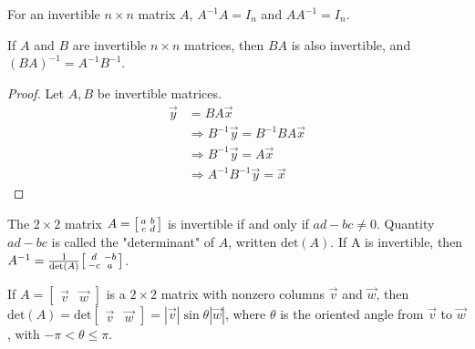 \documentclass[a4paper,11pt]{article}
\begin{document}
\begin{outline}
    For an invertible \(n \times n\) matrix \(A\), \(A^{-1}A = I_n\) and \(AA^{-1} = I_n\).
    
    If \(A\) and \(B\) are invertible \(n \times n\) matrices, then \(BA\) is also invertible, and
    \((BA)^{-1} = A^{-1}B^{-1}\).
    
    \begin{proof}
      Let \(A,B\) be invertible matrices.
      \begin{align*}
        \vec{y} &= BA\vec{x}                                 \\
                &\Rightarrow B^{-1}\vec{y} = B^{-1}BA\vec{x} \\
                &\Rightarrow B^{-1}\vec{y} = A\vec{x}        \\
                &\Rightarrow A^{-1}B^{-1}\vec{y} = \vec{x}
      \end{align*}
    \end{proof}

    The \(2 \times 2\) matrix \(A = \begin{bsmallmatrix} a & b \\ c & d \end{bsmallmatrix}\) is invertible if and only
    if \(ad-bc \neq 0\). Quantity \(ad - bc\) is called the "determinant" of \(A\), written \(\text{det}(A)\). 
    If A is invertible, then \(A^{-1} = \frac{1}{\text{det}(A)} \begin{bsmallmatrix} d & -b \\ -c & a \end{bsmallmatrix}\).
    
    If \(A = \begin{bmatrix} \vec{v} & \vec{w} \end{bmatrix}\) is a \(2 \times 2\) matrix with nonzero columns
    \(\vec{v}\) and \(\vec{w}\), then \(\text{det}(A) = \text{det}\begin{bmatrix} \vec{v} & \vec{w} \end{bmatrix} =
    |\vec{v}|\sin{\theta}|\vec{w}|\), where \(\theta\) is the oriented angle from \(\vec{v}\) to \(\vec{w}\),
    with \(-\pi < \theta \leq \pi\).
    

\end{outline}
\end{document}
